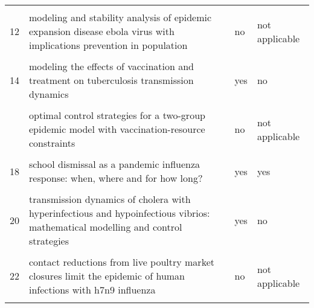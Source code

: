 \documentclass[
]{article}
\begin{document}
\begin{landscape}
\begin{longtable}{l>{\raggedright\arraybackslash}p{9cm}ll}
\addlinespace
\cellcolor{gray!6}{11} & \cellcolor{gray!6}{mathematical analysis of a cholera infection model with vaccination strategy} & \cellcolor{gray!6}{no} & \cellcolor{gray!6}{not applicable}\\
12 & modeling and stability analysis of epidemic expansion disease ebola virus with implications prevention in population & no & not applicable\\
\cellcolor{gray!6}{13} & \cellcolor{gray!6}{modeling the effectiveness of respiratory protective devices in reducing influenza outbreak} & \cellcolor{gray!6}{no} & \cellcolor{gray!6}{not applicable}\\
14 & modeling the effects of vaccination and treatment on tuberculosis transmission dynamics & yes & no\\
\cellcolor{gray!6}{15} & \cellcolor{gray!6}{optimal control and cost-effective analysis of the 2017 meningitis outbreak in nigeria} & \cellcolor{gray!6}{yes} & \cellcolor{gray!6}{yes}\\
\addlinespace
16 & optimal control strategies for a two-group epidemic model with vaccination-resource constraints & no & not applicable\\
\cellcolor{gray!6}{17} & \cellcolor{gray!6}{optimal media reporting intensity on mitigating spread of an emerging infectious disease} & \cellcolor{gray!6}{no} & \cellcolor{gray!6}{not applicable}\\
18 & school dismissal as a pandemic influenza response: when, where and for how long? & yes & yes\\
\cellcolor{gray!6}{19} & \cellcolor{gray!6}{study on modeling simulation and optimal control method for the transmission risk of the ebola virus} & \cellcolor{gray!6}{no} & \cellcolor{gray!6}{not applicable}\\
20 & transmission dynamics of cholera with hyperinfectious and hypoinfectious vibrios: mathematical modelling and control strategies & yes & no\\
\addlinespace
\cellcolor{gray!6}{21} & \cellcolor{gray!6}{a new epidemics–logistics model: insights into controlling the ebola virus disease in west africa} & \cellcolor{gray!6}{yes} & \cellcolor{gray!6}{yes}\\
22 & contact reductions from live poultry market closures limit the epidemic of human infections with h7n9 influenza & no & not applicable\\
\cellcolor{gray!6}{23} & \cellcolor{gray!6}{disparities in spread and control of influenza in slums of delhi: findings from an agent-based modelling study} & \cellcolor{gray!6}{no} & \cellcolor{gray!6}{not applicable}\\

\end{longtable}
\end{landscape}
\end{document}
